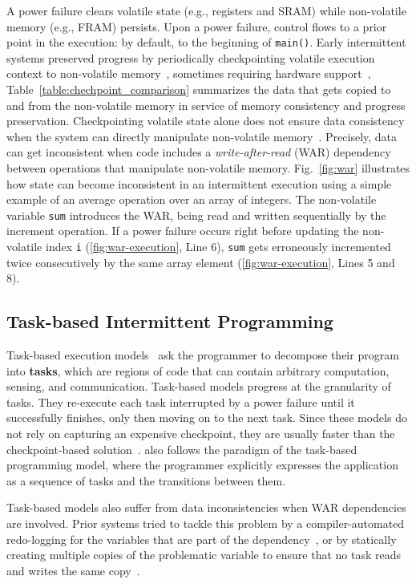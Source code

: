 A power failure clears volatile state (e.g., registers and SRAM) while non-volatile memory (e.g., FRAM) persists. Upon a power failure, control flows to a prior point in the execution: by default, to the beginning of {\tt main()}. Early intermittent systems preserved progress by periodically checkpointing volatile execution context to non-volatile memory~\cite{mementos}, sometimes requiring hardware support~\cite{mottola2017harvos,hibernusplusplus,hibernus,idetic,quickrecall}, Table~\ref{table:chechpoint_comparison} summarizes the data that gets copied to and from the non-volatile memory in service of memory consistency and progress preservation. Checkpointing volatile state alone does not ensure data consistency when the system can directly manipulate non-volatile memory~\cite{mspcdino}. Precisely, data can get inconsistent when code includes a \emph{write-after-read} (WAR) dependency between operations that manipulate non-volatile memory. Fig.~\ref{fig:war} illustrates how state can become inconsistent in an intermittent execution using a simple example of an average operation over an array of integers.
The non-volatile variable \texttt{sum} introduces the WAR, being read and written sequentially by the increment operation. If a power failure occurs right before updating the non-volatile index \texttt{i} (\ref{fig:war-execution}, Line 6), \texttt{sum} gets erroneously incremented twice consecutively by the same array element (\ref{fig:war-execution}, Lines 5 and 8).

\subsection{Task-based Intermittent Programming}
\label{section:background_task_computing}

Task-based execution models~\cite{dino,chain,alpaca} ask the programmer to decompose their program into \textbf{tasks}, which are regions of code that can contain arbitrary computation, sensing, and communication. Task-based models progress at the granularity of tasks. They re-execute each task interrupted by a power failure until it successfully finishes, only then moving on to the next task. Since these models do not rely on capturing an expensive checkpoint, they are usually faster than the checkpoint-based solution~\cite{chain, alpaca}.  \sys also follows the paradigm of the task-based programming model, where the programmer explicitly expresses the application as a sequence of tasks and the transitions between them.

Task-based models also suffer from data inconsistencies when WAR dependencies are involved. Prior systems tried to tackle this problem by a compiler-automated redo-logging for the variables that are part of the dependency~\cite{alpaca}, or by statically creating multiple copies of the problematic variable to ensure that no task reads and writes the same copy~\cite{chain}.

